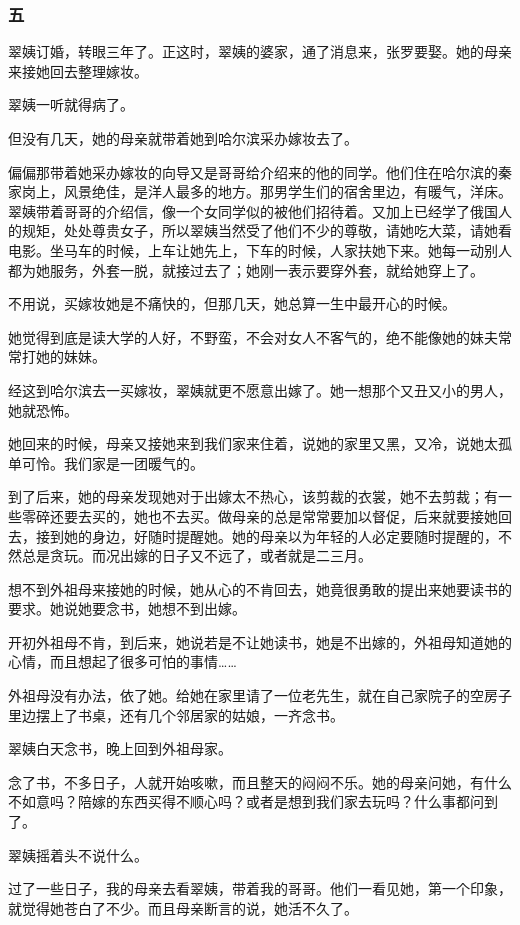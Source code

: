 \subsubsection*{五}
\par 翠姨订婚，转眼三年了。正这时，翠姨的婆家，通了消息来，张罗要娶。她的母亲来接她回去整理嫁妆。
\par 翠姨一听就得病了。
\par 但没有几天，她的母亲就带着她到哈尔滨采办嫁妆去了。
\par 偏偏那带着她采办嫁妆的向导又是哥哥给介绍来的他的同学。他们住在哈尔滨的秦家岗上，风景绝佳，是洋人最多的地方。那男学生们的宿舍里边，有暖气，洋床。翠姨带着哥哥的介绍信，像一个女同学似的被他们招待着。又加上已经学了俄国人的规矩，处处尊贵女子，所以翠姨当然受了他们不少的尊敬，请她吃大菜，请她看电影。坐马车的时候，上车让她先上，下车的时候，人家扶她下来。她每一动别人都为她服务，外套一脱，就接过去了；她刚一表示要穿外套，就给她穿上了。
\par 不用说，买嫁妆她是不痛快的，但那几天，她总算一生中最开心的时候。
\par 她觉得到底是读大学的人好，不野蛮，不会对女人不客气的，绝不能像她的妹夫常常打她的妹妹。
\par 经这到哈尔滨去一买嫁妆，翠姨就更不愿意出嫁了。她一想那个又丑又小的男人，她就恐怖。
\par 她回来的时候，母亲又接她来到我们家来住着，说她的家里又黑，又冷，说她太孤单可怜。我们家是一团暖气的。
\par 到了后来，她的母亲发现她对于出嫁太不热心，该剪裁的衣裳，她不去剪裁；有一些零碎还要去买的，她也不去买。做母亲的总是常常要加以督促，后来就要接她回去，接到她的身边，好随时提醒她。她的母亲以为年轻的人必定要随时提醒的，不然总是贪玩。而况出嫁的日子又不远了，或者就是二三月。
\par 想不到外祖母来接她的时候，她从心的不肯回去，她竟很勇敢的提出来她要读书的要求。她说她要念书，她想不到出嫁。
\par 开初外祖母不肯，到后来，她说若是不让她读书，她是不出嫁的，外祖母知道她的心情，而且想起了很多可怕的事情……
\par 外祖母没有办法，依了她。给她在家里请了一位老先生，就在自己家院子的空房子里边摆上了书桌，还有几个邻居家的姑娘，一齐念书。
\par 翠姨白天念书，晚上回到外祖母家。
\par 念了书，不多日子，人就开始咳嗽，而且整天的闷闷不乐。她的母亲问她，有什么不如意吗？陪嫁的东西买得不顺心吗？或者是想到我们家去玩吗？什么事都问到了。
\par 翠姨摇着头不说什么。
\par 过了一些日子，我的母亲去看翠姨，带着我的哥哥。他们一看见她，第一个印象，就觉得她苍白了不少。而且母亲断言的说，她活不久了。
